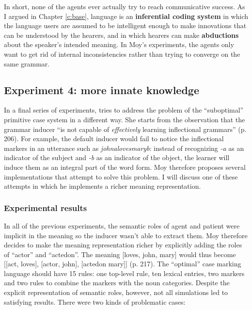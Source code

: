 In short, none of the agents ever actually try to reach communicative success. As I argued in Chapter \ref{c:base}, language is an {\bfseries inferential coding system} in which the language users are assumed to be intelligent enough to make innovations that can be understood by the hearers, and in which hearers can make {\bfseries abductions} about the speaker's intended meaning. In Moy's experiments, the agents only want to get rid of internal inconsistencies rather than trying to converge on the same grammar.

\subsection{Experiment 4: more innate knowledge}

In a final series of experiments, \citet[chapter 7]{moy06case} tries to address the problem of the ``suboptimal'' primitive case system in a different way. She starts from the observation that the grammar inducer  ``is not capable of  {\em effectively}  learning inflectional grammars''  (p. 206). For example, the default inducer would fail to notice the inflectional markers in an utterance such as {\em johnalovesmaryb}: instead of recognizing {\em -a} as an indicator of the subject and {\em -b} as an indicator of the object, the learner will induce them as an integral part of the word form. Moy therefore proposes several implementations that attempt to solve this problem. I will discuss one of these attempts in which he implements a richer meaning representation.


\subsubsection{Experimental results}
In all of the previous experiments, the semantic roles of agent and patient were implicit in the meaning so the inducer wasn't able to extract them. Moy therefore decides to make the meaning representation richer by explicitly adding the roles of ``actor'' and ``actedon''. The meaning [loves, john, mary] would thus become [[act, loves], [actor, john], [actedon mary]] (p. 217). The ``optimal'' case marking language should have 15 rules: one top-level rule, ten lexical entries, two markers and two rules to combine the markers with the noun categories. Despite the explicit representation of semantic roles, however, not all simulations led to satisfying results. There were two kinds of problematic cases:

